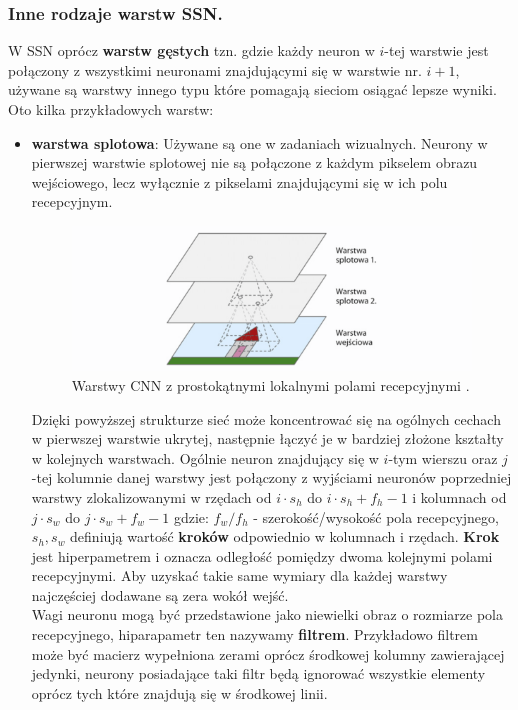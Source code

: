\documentclass{article}
\begin{document}
\subsubsection{Inne rodzaje warstw SSN.}
W SSN oprócz \textbf{warstw gęstych} tzn.
gdzie każdy neuron w $i$-tej warstwie jest połączony z wszystkimi neuronami
znajdującymi się w warstwie nr. $i+1$,
używane są warstwy innego typu które pomagają sieciom
osiągać lepsze wyniki. Oto kilka przykładowych warstw:
\begin{itemize}
\item \textbf{warstwa splotowa}:
Używane są one w zadaniach wizualnych. Neurony w pierwszej warstwie splotowej nie są
połączone z każdym pikselem obrazu wejściowego, lecz wyłącznie z pikselami
znajdującymi się w ich polu recepcyjnym.

\begin{figure}[H]
\centering
\includegraphics[scale=0.6]{cnn.png}
\caption{Warstwy CNN z prostokątnymi lokalnymi polami recepcyjnymi \cite{um}.}
\end{figure}

Dzięki powyższej strukturze sieć może koncentrować się na ogólnych cechach w pierwszej warstwie
ukrytej, następnie łączyć je w bardziej złożone kształty w kolejnych warstwach. Ogólnie neuron
znajdujący się w $i$-tym wierszu oraz $j$-tej kolumnie danej warstwy jest połączony z wyjściami 
neuronów poprzedniej warstwy zlokalizowanymi w rzędach od $i \cdot s_h$ do 
$i \cdot s_h + f_h-1$  i kolumnach
od $j \cdot s_w $ do $j \cdot s_w + f_w-1$
gdzie: $f_w/f_h$ - szerokość/wysokość pola recepcyjnego, $s_h, s_w$ definiują wartość 
\textbf{kroków} odpowiednio w kolumnach i rzędach. \textbf{Krok} jest hiperpametrem
i oznacza odległość
pomiędzy dwoma kolejnymi polami recepcyjnymi. Aby uzyskać takie same wymiary 
dla każdej warstwy najczęściej dodawane są zera wokół wejść.\\

Wagi neuronu mogą być przedstawione jako niewielki obraz o rozmiarze pola recepcyjnego, 
hiparapametr ten nazywamy \textbf{filtrem}.
Przykładowo filtrem może być macierz wypełniona zerami oprócz środkowej
kolumny zawierającej jedynki, neurony posiadające taki filtr będą ignorować wszystkie elementy
oprócz tych które znajdują się w środkowej linii.


\end{itemize}
\end{document}
